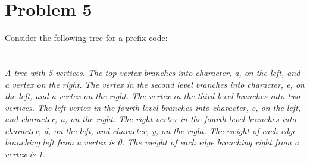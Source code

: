 \documentclass{amsart}
\theoremstyle{definition}
\theoremstyle{Exercise}
\theoremstyle{remark}
\theoremstyle{rule}
\numberwithin{equation}{section}
\begin{document}
\section*{Problem 5}

Consider the following tree for a prefix code:\\
\\\\
{\color{blue}{\bf Figure 13:} \emph{A tree with 5 vertices. The top vertex branches into character, a, on the left, and a vertex on the right. The vertex in the second level branches into character, e, on the left, and a vertex on the right. The vertex in the third level branches into two vertices. The left vertex in the fourth level branches into character, c, on the left, and character, n, on the right. The right vertex in the fourth level branches into character, d, on the left, and character, y, on the right. The weight of each edge branching left from a vertex is 0. The weight of each edge branching right from a vertex is 1.
\\
}
}
\\
\\
\end{document}
